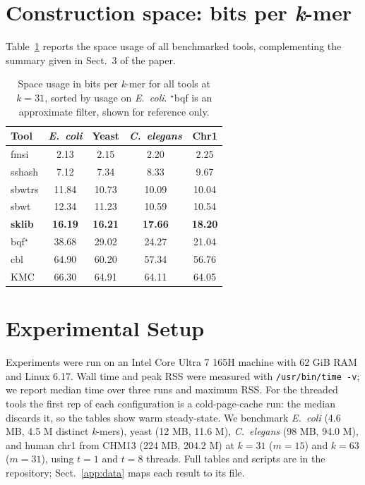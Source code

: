 \documentclass[runningheads,a4paper]{llncs}
\newcommand{\kmer}{\emph{k}-mer\xspace}
\newcommand{\kmers}{\emph{k}-mers\xspace}
\newcommand{\sklib}{\textsf{sklib}\xspace}
\newcommand{\kmc}{\textsf{KMC}\xspace}
\newcommand{\sbwt}{\textsf{sbwt}\xspace}
\newcommand{\sbwtrs}{\textsf{sbwtrs}\xspace}
\newcommand{\sshash}{\textsf{sshash}\xspace}
\newcommand{\cbl}{\textsf{cbl}\xspace}
\newcommand{\fmsi}{\textsf{fmsi}\xspace}
\newcommand{\bqf}{\textsf{bqf}\xspace}
\newif\ifrevmarkup\revmarkupfalse
\newcommand{\rev}[1]{\ifrevmarkup\textcolor{blue}{#1}\else#1\fi}
\newenvironment{revblock}{\ifrevmarkup\color{blue}\fi}{}
\begin{document}
\section{Construction space: bits per \texorpdfstring{\kmer}{k-mer}}
\label{app:bits}
Table~\ref{tab:bits-per-kmer} reports the space usage of all benchmarked tools, complementing the summary given in Sect.~3 of the paper.

\begin{table}[h]
\centering
\small
\setlength{\tabcolsep}{3pt}
\caption{Space usage in bits per \kmer for all tools at \(k=31\)\rev{, sorted by usage on \emph{E.~coli}. $^{\star}$\bqf{} is an approximate filter, shown for reference only.}}
\label{tab:bits-per-kmer}

\begin{revblock}
\begin{tabular}{lcccc}
\toprule
Tool & \textit{E.~coli} & Yeast & \textit{C.~elegans} & Chr1 \\
\midrule
\fmsi           &  2.13 &  2.15 &  2.20 &  2.25 \\
\sshash         &  7.12 &  7.34 &  8.33 &  9.67 \\
\sbwtrs         & 11.84 & 10.73 & 10.09 & 10.04 \\
\sbwt           & 12.34 & 11.23 & 10.59 & 10.54 \\
\textbf{\sklib} & \textbf{16.19} & \textbf{16.21} & \textbf{17.66} & \textbf{18.20} \\
\bqf{}$^{\star}$  & 38.68 & 29.02 & 24.27 & 21.04 \\
\cbl            & 64.90 & 60.20 & 57.34 & 56.76 \\
\kmc            & 66.30 & 64.91 & 64.11 & 64.05 \\
\bottomrule
\end{tabular}
\end{revblock}

\end{table}

\section{Experimental Setup}
\label{app:exsetup}
Experiments were run on an Intel Core Ultra 7 165H machine with 62 GiB RAM and Linux 6.17. Wall time and peak RSS were measured with \texttt{/usr/bin/time -v}; we report median time over three runs and maximum RSS. For the threaded tools the first rep of each configuration is a cold-page-cache run: the median discards it, so the tables show warm steady-state. We benchmark \emph{E.~coli} (4.6 MB, 4.5 M distinct \kmers), yeast (12 MB, 11.6 M), \emph{C.~elegans} (98 MB, 94.0 M), and human chr1 from CHM13 (224 MB, 204.2 M) at $k=31$ ($m=15$) and $k=63$ ($m=31$), using $t=1$ and $t=8$ threads. \rev{Full tables and scripts are in the repository; Sect.~\ref{app:data} maps each result to its file.}
\end{document}
